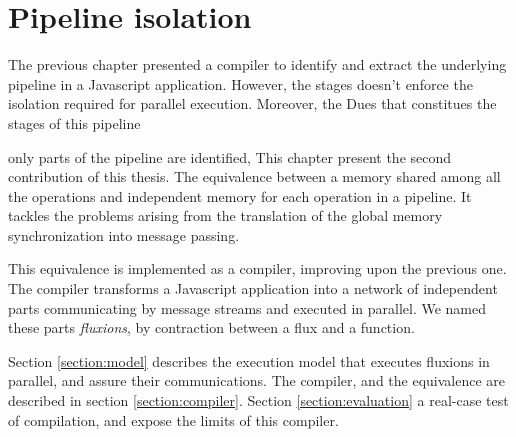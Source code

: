 \chapter{Pipeline isolation} \label{chapter6}
\minitoc
\eject

The previous chapter presented a compiler to identify and extract the underlying pipeline in a Javascript application.
However, the stages doesn't enforce the isolation required for parallel execution.
Moreover, the Dues that constitues the stages of this pipeline 

only parts of the pipeline are identified, 
This chapter present the second contribution of this thesis.
The equivalence between a memory shared among all the operations and independent memory for each operation in a pipeline.
It tackles the problems arising from the translation of the global memory synchronization into message passing.

This equivalence is implemented as a compiler, improving upon the previous one.
The compiler transforms a Javascript application into a network of independent parts communicating by message streams and executed in parallel.
We named these parts \textit{fluxions}, by contraction between a flux and a function.

Section \ref{section:model} describes the execution model that executes fluxions in parallel, and assure their communications.
The compiler, and the equivalence are described in section \ref{section:compiler}.
Section \ref{section:evaluation} a real-case test of compilation, and expose the limits of this compiler.


